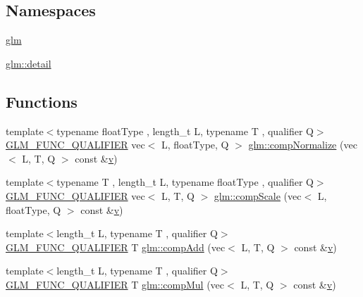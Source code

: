 \subsection*{Namespaces}
\begin{DoxyCompactItemize}
\item 
 \hyperlink{namespaceglm}{glm}
\item 
 \hyperlink{namespaceglm_1_1detail}{glm\+::detail}
\end{DoxyCompactItemize}
\subsection*{Functions}
\begin{DoxyCompactItemize}
\item 
{\footnotesize template$<$typename float\+Type , length\+\_\+t L, typename T , qualifier Q$>$ }\\\hyperlink{setup_8hpp_a33fdea6f91c5f834105f7415e2a64407}{G\+L\+M\+\_\+\+F\+U\+N\+C\+\_\+\+Q\+U\+A\+L\+I\+F\+I\+ER} vec$<$ L, float\+Type, Q $>$ \hyperlink{group__gtx__component__wise_ga8f2b81ada8515875e58cb1667b6b9908}{glm\+::comp\+Normalize} (vec$<$ L, T, Q $>$ const \&\hyperlink{_s_d_l__opengl_8h_a10a82eabcb59d2fcd74acee063775f90}{v})
\item 
{\footnotesize template$<$typename T , length\+\_\+t L, typename float\+Type , qualifier Q$>$ }\\\hyperlink{setup_8hpp_a33fdea6f91c5f834105f7415e2a64407}{G\+L\+M\+\_\+\+F\+U\+N\+C\+\_\+\+Q\+U\+A\+L\+I\+F\+I\+ER} vec$<$ L, T, Q $>$ \hyperlink{group__gtx__component__wise_ga80abc2980d65d675f435d178c36880eb}{glm\+::comp\+Scale} (vec$<$ L, float\+Type, Q $>$ const \&\hyperlink{_s_d_l__opengl_8h_a10a82eabcb59d2fcd74acee063775f90}{v})
\item 
{\footnotesize template$<$length\+\_\+t L, typename T , qualifier Q$>$ }\\\hyperlink{setup_8hpp_a33fdea6f91c5f834105f7415e2a64407}{G\+L\+M\+\_\+\+F\+U\+N\+C\+\_\+\+Q\+U\+A\+L\+I\+F\+I\+ER} T \hyperlink{namespaceglm_ad69e502a1932680c5b2767998e2434d7}{glm\+::comp\+Add} (vec$<$ L, T, Q $>$ const \&\hyperlink{_s_d_l__opengl_8h_a10a82eabcb59d2fcd74acee063775f90}{v})
\item 
{\footnotesize template$<$length\+\_\+t L, typename T , qualifier Q$>$ }\\\hyperlink{setup_8hpp_a33fdea6f91c5f834105f7415e2a64407}{G\+L\+M\+\_\+\+F\+U\+N\+C\+\_\+\+Q\+U\+A\+L\+I\+F\+I\+ER} T \hyperlink{namespaceglm_aa5abf1348de4c38ac2d81be2e0f4798e}{glm\+::comp\+Mul} (vec$<$ L, T, Q $>$ const \&\hyperlink{_s_d_l__opengl_8h_a10a82eabcb59d2fcd74acee063775f90}{v})

\end{DoxyCompactItemize}
